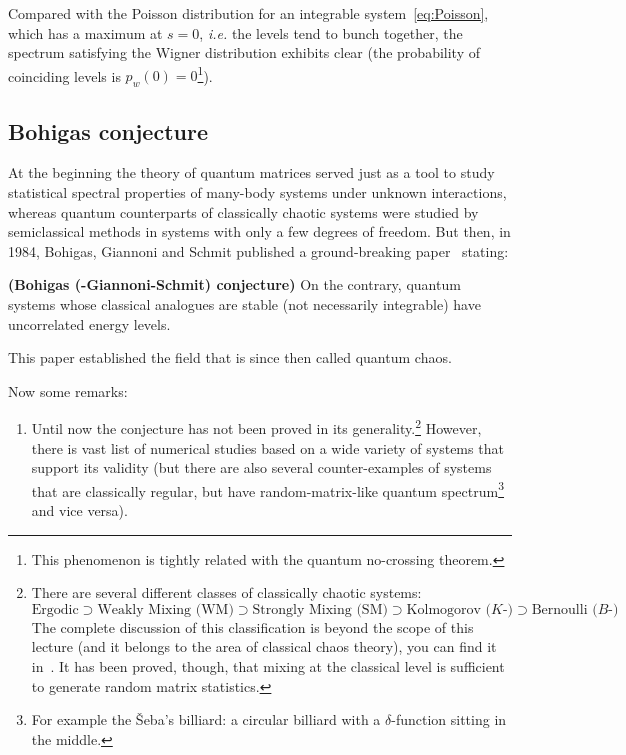 \documentclass[a4paper,11pt,twoside]{article}
\begin{document}
        Compared with the Poisson distribution for an integrable system~\eqref{eq:Poisson}, which has a maximum at $s=0$, \emph{i.e.} the levels tend to bunch together, the spectrum satisfying the Wigner distribution exhibits clear  (the probability of coinciding levels is $p_{w}(0)=0$\footnote{This phenomenon is tightly related with the quantum no-crossing theorem.}). 

        \subsection{Bohigas conjecture}
        At the beginning the theory of quantum matrices served just as a tool to study statistical spectral properties of many-body systems under unknown interactions, whereas quantum counterparts of classically chaotic systems were studied by semiclassical methods in systems with only a few degrees of freedom.
        But then, in 1984, Bohigas, Giannoni and Schmit published a ground-breaking paper~\cite{Boh84} stating:
        \begin{theorem}
            {\bf (Bohigas (-Giannoni-Schmit) conjecture)}
            On the contrary, quantum systems whose classical analogues are stable (not necessarily integrable) have uncorrelated energy levels.
        \end{theorem}
        This paper established the field that is since then called quantum chaos.

        Now some remarks: 
        \begin{enumerate}
            \item Until now the conjecture has not been proved in its generality.\footnote{
                    There are several different classes of classically chaotic systems:
                    \begin{equation*}
                        \boxed{\text{Ergodic}}
                            \supset\boxed{\text{Weakly Mixing (WM)}}
                            \supset\boxed{\text{Strongly Mixing (SM)}}
                            \supset\boxed{\text{Kolmogorov ($K$-)}}
                            \supset\boxed{\text{Bernoulli ($B$-)}}
                    \end{equation*}
                    The complete discussion of this classification is beyond the scope of this lecture (and it belongs to the area of classical chaos theory), you can find it in~\cite{Sin77}.
                    It has been proved, though, that mixing at the classical level is sufficient to generate random matrix statistics.
                } 
                However, there is vast list of numerical studies based on a wide variety of systems that support its validity (but there are also several counter-examples of systems that are classically regular, but have random-matrix-like quantum spectrum\footnote{For example the Šeba's billiard: a circular billiard with a $\delta$-function sitting in the middle.} and vice versa).
        \end{enumerate}
\end{document}
